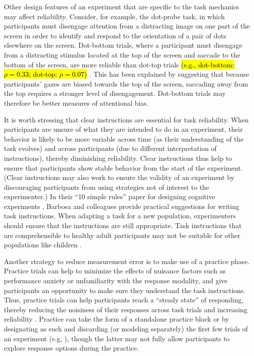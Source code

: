 \documentclass[a4paper,12pt]{article}
\begin{document}
Other design features of an experiment that are specific to the task mechanics may affect reliability. Consider, for example, the dot-probe task, in which participants must disengage attention from a distracting image on one part of the screen in order to identify and respond to the orientation of a pair of dots elsewhere on the screen. Dot-bottom trials, where a participant must disengage from a distracting stimulus located at the top of the screen and saccade to the bottom of the screen, are more reliable than dot-top trials \hl{(e.g., dot-bottom: $\rho = 0.33$; dot-top: $\rho = 0.07$)} \cite{price2015empirical, aday2019extended}. This has been explained by suggesting that because participants' gazes are biased towards the top of the screen, saccading away from the top requires a stronger level of disengagement. Dot-bottom trials may therefore be better measures of attentional bias. 

It is worth stressing that clear instructions are essential for task reliability. When participants are unsure of what they are intended to do in an experiment, their behavior is likely to be more variable across time (as their understanding of the task evolves) and across participants (due to different interpretation of instructions), thereby diminishing reliability. Clear instructions thus help to ensure that participants show stable behavior from the start of the experiment. (Clear instructions may also work to ensure the validity of an experiment by discouraging participants from using strategies not of interest to the experimenter.) In their ``10 simple rules'' paper for designing cognitive experiments \cite{barbosa2022practical}, Barbosa and colleagues provide practical suggestions for writing task instructions. When adapting a task for a new population, experimenters should ensure that the instructions are still appropriate. Task instructions that are comprehensible to healthy adult participants may not be suitable for other populations like children \cite{hughes2002measuring}. 

Another strategy to reduce measurement error is to make use of a practice phase. Practice trials can help to minimize the effects of nuisance factors such as performance anxiety or unfamiliarity with the response modality, and give participants an opportunity to make sure they understand the task instructions. Thus, practice trials can help participants reach a ``steady state'' of responding, thereby reducing the noisiness of their responses across task trials and increasing reliability \cite{alexander2003effects}. Practice can take the form of a standalone practice block or by designating as such and discarding (or modeling separately) the first few trials of an experiment (e.g, \cite{mclean2018towards}), though the latter may not fully allow participants to explore response options during the practice. 
\end{document}

